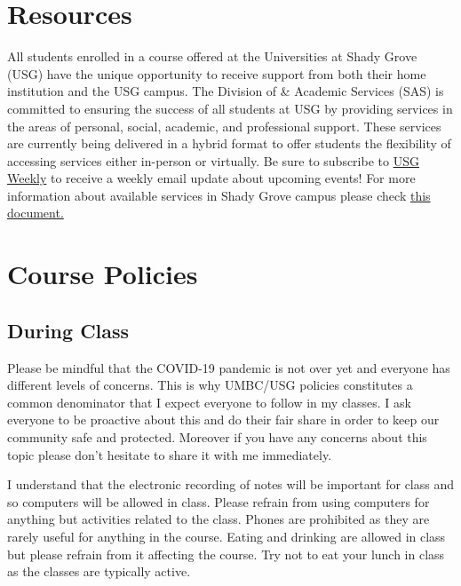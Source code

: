 \documentclass[11pt]{article}
\begin{document}
\newpage

\section*{Resources}
All students enrolled in a course offered at the Universities at Shady Grove (USG) have the unique opportunity to receive support from both their home institution and the USG campus. The Division of  \& Academic Services (SAS) is committed to ensuring the success of all students at USG by providing services in the areas of personal, social, academic, and professional support. These services are currently being delivered in a hybrid format to offer students the flexibility of accessing services either in-person or virtually. Be sure to subscribe to \href{https://visitor.r20.constantcontact.com/manage/optin?v=001w-E_TKzSoiZOmBq--83riRAiTv4nrjQS}{USG Weekly} to receive a weekly email update about upcoming events! For more information about available services in Shady Grove campus please check \href{https://docs.google.com/document/d/10Mi70FEECEVqA675n-NadBkhAHAUqkM2/edit?usp=sharing&ouid=105504176067978366034&rtpof=true&sd=true}{this document.}


\section*{Course Policies}

\subsection*{During Class}

\footnotesize{ Please be mindful that the COVID-19 pandemic is not over yet and everyone has different levels of concerns. This is why UMBC/USG policies constitutes a common denominator that I expect everyone to follow in my classes. I ask everyone to be proactive about this and do their fair share in order to keep our community safe and protected. Moreover if you have any concerns about this topic please don't hesitate to share it with me immediately.}

\footnotesize{I understand that the electronic recording of notes will be important for class and so computers will be allowed in class. Please refrain from using computers for anything but activities related to the class. Phones are prohibited as they are rarely useful for anything in the course. Eating and drinking are allowed in class but please refrain from it affecting the course. Try not to eat your lunch in class as the classes are typically active.}
\end{document}
